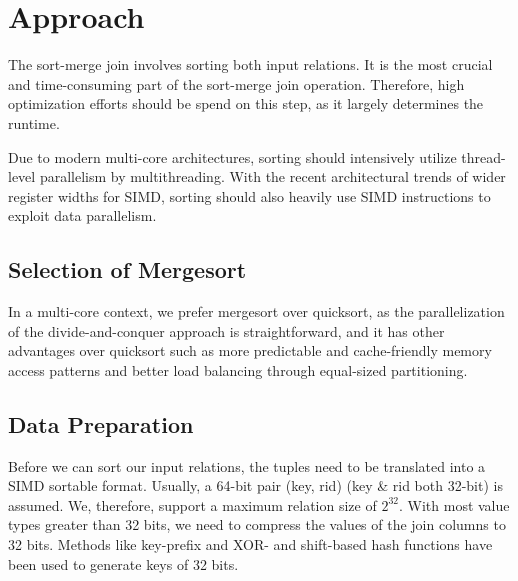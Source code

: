 \section{Approach}
\label{sec:approach}


The sort-merge join involves sorting both input relations. It is the most crucial and 
time-consuming part of the sort-merge join operation. Therefore, high optimization efforts should
be spend on this step, as it largely determines the runtime. 

Due to modern multi-core 
architectures, sorting should intensively utilize thread-level parallelism by multithreading.
With the recent architectural trends of wider register widths for SIMD, sorting should also
heavily use SIMD instructions to exploit data parallelism. 

\subsection{Selection of Mergesort}
In a multi-core context, we prefer mergesort over quicksort, as the parallelization of the divide-and-conquer approach
is straightforward, and it has other advantages over quicksort such as more predictable and 
cache-friendly memory access patterns and better load balancing through equal-sized partitioning. 

\subsection{Data Preparation}
Before we can sort our input relations, the tuples need to be translated into a SIMD sortable
format. Usually, a 64-bit pair (key, rid) (key \& rid both 32-bit) is assumed. We, therefore,
support a maximum relation size of $2^{32}$. With most value types greater
than 32 bits, we need to compress the values of the join columns to 32 bits. Methods like 
key-prefix \cite{chris_nyberg__1994} and XOR- and shift-based hash functions \cite{1319989} have 
been used to generate keys of 32 bits.

